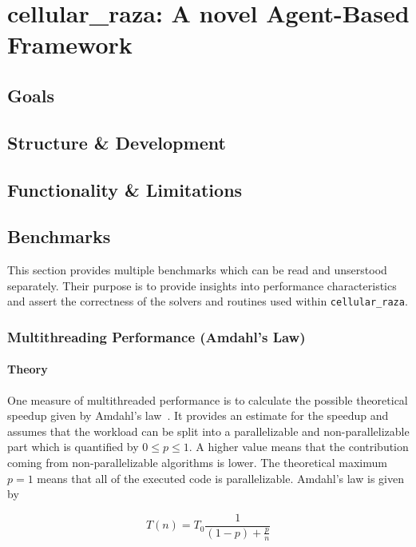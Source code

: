 \documentclass[a4paper]{article}
\begin{document}
\pagebreak
\section{cellular\_raza: A novel Agent-Based Framework}
\cite{Pleyer2025}
\subsection{Goals}
\subsection{Structure \& Development}
\subsection{Functionality \& Limitations}

\subsection{Benchmarks}
This section provides multiple benchmarks which can be read and unserstood separately.
Their purpose is to provide insights into performance characteristics and assert the correctness of
the solvers and routines used within \texttt{cellular\_raza}.

\subsubsection{Multithreading Performance (Amdahl's Law)}

\paragraph{Theory}
One measure of multithreaded performance is to calculate the possible theoretical speedup
given by Amdahl's law~\cite{Rodgers1985}.
It provides an estimate for the speedup and assumes that the workload can be split into a
parallelizable and non-parallelizable part which is quantified by $0\leq p \leq1$.
A higher value means that the contribution coming from non-parallelizable algorithms is lower.
The theoretical maximum $p=1$ means that all of the executed code is parallelizable.
Amdahl's law is given by

\begin{equation}
    T(n) = T_0\frac{1}{(1-p) + \frac{p}{n}}
    \label{eq:amdahls-law}
\end{equation}
\end{document}
